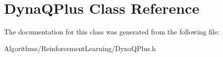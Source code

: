 \hypertarget{classDynaQPlus}{\section{Dyna\+Q\+Plus Class Reference}
\label{classDynaQPlus}
}


The documentation for this class was generated from the following file\+:\begin{DoxyCompactItemize}
\item 
Algorithms/\+Reinforcement\+Learning/Dyna\+Q\+Plus.\+h\end{DoxyCompactItemize}
